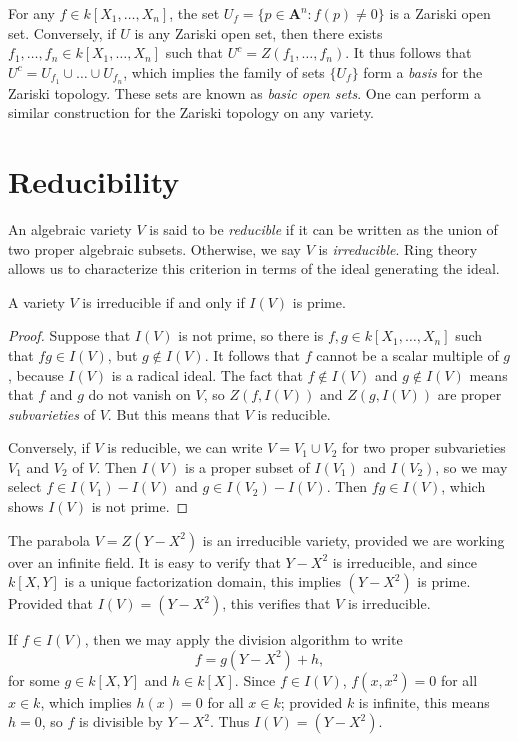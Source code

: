 For any $f \in k[X_1,\dots,X_n]$, the set $U_f = \{ p \in \mathbf{A}^n: f(p) \neq 0 \}$ is a Zariski open set. Conversely, if $U$ is any Zariski open set, then there exists $f_1,\dots,f_n \in k[X_1,\dots,X_n]$ such that $U^c = Z(f_1,\dots,f_n)$. It thus follows that $U^c = U_{f_1} \cup \dots \cup U_{f_n}$, which implies the family of sets $\{ U_f \}$ form a \emph{basis} for the Zariski topology. These sets are known as \emph{basic open sets}. One can perform a similar construction for the Zariski topology on any variety.

\section{Reducibility}

An algebraic variety $V$ is said to be \emph{reducible} if it can be written as the union of two proper algebraic subsets. Otherwise, we say $V$ is \emph{irreducible}. Ring theory allows us to characterize this criterion in terms of the ideal generating the ideal.

\begin{prop}
    A variety $V$ is irreducible if and only if $I(V)$ is prime.
\end{prop}
\begin{proof}
    Suppose that $I(V)$ is not prime, so there is $f,g \in k[X_1,\dots,X_n]$ such that $fg \in I(V)$, but $g \not \in I(V)$. It follows that $f$ cannot be a scalar multiple of $g$, because $I(V)$ is a radical ideal. The fact that $f \not \in I(V)$ and $g \not \in I(V)$ means that $f$ and $g$ do not vanish on $V$, so $Z(f,I(V))$ and $Z(g,I(V))$ are proper \emph{subvarieties} of $V$. But this means that $V$ is reducible.

    Conversely, if $V$ is reducible, we can write $V = V_1 \cup V_2$ for two proper subvarieties $V_1$ and $V_2$ of $V$. Then $I(V)$ is a proper subset of $I(V_1)$ and $I(V_2)$, so we may select $f \in I(V_1) - I(V)$ and $g \in I(V_2) - I(V)$. Then $fg \in I(V)$, which shows $I(V)$ is not prime.
\end{proof}

\begin{example}
    The parabola $V = Z(Y - X^2)$ is an irreducible variety, provided we are working over an infinite field. It is easy to verify that $Y - X^2$ is irreducible, and since $k[X,Y]$ is a unique factorization domain, this implies $(Y - X^2)$ is prime. Provided that $I(V) = (Y - X^2)$, this verifies that $V$ is irreducible.

    If $f \in I(V)$, then we may apply the division algorithm to write
    \[ f = g (Y - X^2) + h, \]
    for some $g \in k[X,Y]$ and $h \in k[X]$. Since $f \in I(V)$, $f(x,x^2) = 0$ for all $x \in k$, which implies $h(x) = 0$ for all $x \in k$; provided $k$ is infinite, this means $h = 0$, so $f$ is divisible by $Y - X^2$. Thus $I(V) = (Y - X^2)$.
\end{example}

